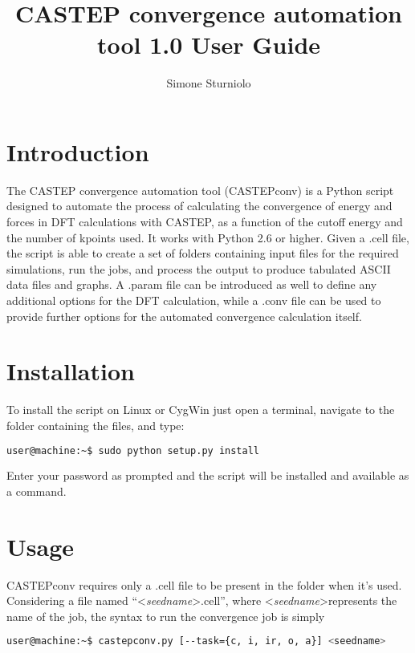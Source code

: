 \documentclass[10pt]{article}
\title{CASTEP convergence automation tool 1.0 User Guide}
\author{Simone Sturniolo}
\begin{document}
\maketitle

\section{Introduction}

The CASTEP convergence automation tool (CASTEPconv) is a Python script designed to automate the process of calculating the convergence of energy and forces in DFT calculations with CASTEP, as a function of the cutoff energy and the number of kpoints used. It works with Python 2.6 or higher. Given a .cell file, the script is able to create a set of folders containing input files for the required simulations, run the jobs, and process the output to produce tabulated ASCII data files and graphs. A .param file can be introduced as well to define any additional options for the DFT calculation, while a .conv file can be used to provide further options for the automated convergence calculation itself.

\section{Installation}

To install the script on Linux or CygWin just open a terminal, navigate to the folder containing the files, and type:

\begin{lstlisting}[language=Bash]
 user@machine:~$ sudo python setup.py install
\end{lstlisting}

Enter your password as prompted and the script will be installed and available as a command.

\section{Usage}

CASTEPconv requires only a .cell file to be present in the folder when it's used. Considering a file named ``\textless \textit{seedname}\textgreater.cell'', where \textless \textit{seedname}\textgreater represents the name of the job, the syntax to run the convergence job is simply

\begin{lstlisting}[language=Bash]
 user@machine:~$ castepconv.py [--task={c, i, ir, o, a}] <seedname>
\end{lstlisting}
\end{document}
